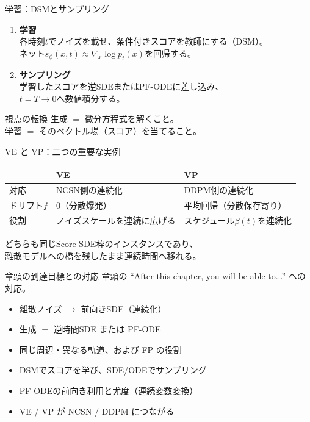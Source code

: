 \begin{frame}{学習：DSMとサンプリング}
    \begin{enumerate}
        \item \textbf{学習}\\
        各時刻$t$でノイズを載せ、条件付きスコアを教師にする（DSM）。\\
        ネット$s_\phi(x,t)\approx\nabla_x\log p_t(x)$を回帰する。
        \item \textbf{サンプリング}\\
        学習したスコアを逆SDEまたはPF-ODEに差し込み、\\
        $t=T\to 0$へ数値積分する。
    \end{enumerate}
    \begin{block}{視点の転換}
        生成 $=$ 微分方程式を解くこと。\\
        学習 $=$ そのベクトル場（スコア）を当てること。
    \end{block}
\end{frame}
\asmain
\begin{frame}{VE と VP：二つの重要な実例}
    \centering
    \footnotesize
    \renewcommand{\arraystretch}{1.35}
    \begin{tabular}{|l|p{}|p{}|}
        \hline
        & \textbf{VE} & \textbf{VP} \\
        \hline
        対応
        & NCSN側の連続化
        & DDPM側の連続化
        \\
        \hline
        ドリフト$f$
        & $0$（分散爆発）
        & 平均回帰（分散保存寄り）
        \\
        \hline
        役割
        & ノイズスケールを連続に広げる
        & スケジュール$\beta(t)$を連続化
        \\
        \hline
    \end{tabular}
    \normalsize
    \vfill
    どちらも同じScore SDE枠のインスタンスであり、\\
    離散モデルへの橋を残したまま連続時間へ移れる。
\end{frame}
\asmain
\begin{frame}{章頭の到達目標との対応}
    章頭の ``After this chapter, you will be able to...'' への対応。
    \begin{itemize}
        \item 離散ノイズ $\to$ 前向きSDE（連続化）
        \item 生成 $=$ 逆時間SDE または PF-ODE
        \item 同じ周辺・異なる軌道、および FP の役割
        \item DSMでスコアを学び、SDE/ODEでサンプリング
        \item PF-ODEの前向き利用と尤度（連続変数変換）
        \item VE / VP が NCSN / DDPM につながる
    \end{itemize}
\end{frame}
